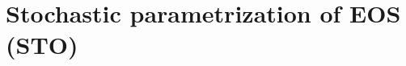 \chapter{Stochastic parametrization of EOS (STO)}
\label{STO}

\minitoc


\newpage
$\ $\newline    %